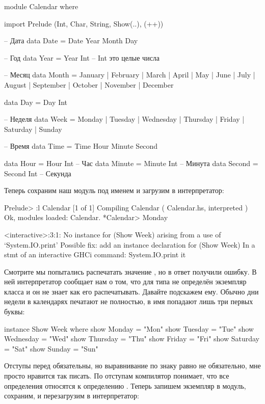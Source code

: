 \begin{code}
module Calendar where

import Prelude (Int, Char, String, Show(..), (++))

-- Дата
data Date = Date Year Month Day

-- Год
data Year  = Year Int       -- Int это целые числа

-- Месяц
data Month  = January    | February   | March    | April          
            | May        | June       | July     | August   
            | September  | October    | November | December

data Day = Day Int

-- Неделя
data Week  = Monday     | Tuesday   | Wednesday 
           | Thursday   | Friday    | Saturday     
           | Sunday   

-- Время
data Time = Time Hour Minute Second

data Hour   = Hour   Int    -- Час
data Minute = Minute Int    -- Минута
data Second = Second Int    -- Секунда
\end{code}


Теперь сохраним наш модуль под именем  и 
загрузим в интерпретатор:

\begin{code}
Prelude> :l Calendar
[1 of 1] Compiling Calendar         ( Calendar.hs, interpreted )
Ok, modules loaded: Calendar.
*Calendar> Monday

<interactive>:3:1:
    No instance for (Show Week)
      arising from a use of `System.IO.print'
    Possible fix: add an instance declaration for (Show Week)
    In a stmt of an interactive GHCi command: System.IO.print it
\end{code}

Смотрите мы попытались распечатать значение , но
в ответ получили ошибку. В ней интерпретатор сообщает нам о том,
что для типа  не определён экземпляр класса 
и он не знает как его распечатывать. Давайте подскажем ему. 
Обычно дни недели в календарях печатают не полностью, 
в имя попадают лишь три первых буквы: 

\begin{code}
instance Show Week where
    show Monday     = "Mon"
    show Tuesday    = "Tue"
    show Wednesday  = "Wed"
    show Thursday   = "Thu"  
    show Friday     = "Fri" 
    show Saturday   = "Sat"
    show Sunday     = "Sun"
\end{code}

Отступы перед  обязательны, но выравнивание по знаку равно 
не обязательно, мне просто нравится так писать. По отступам компилятор
понимает, что все определения относятся к определению . 
Теперь запишем экземпляр в модуль, сохраним, и перезагрузим
в интерпретатор:

